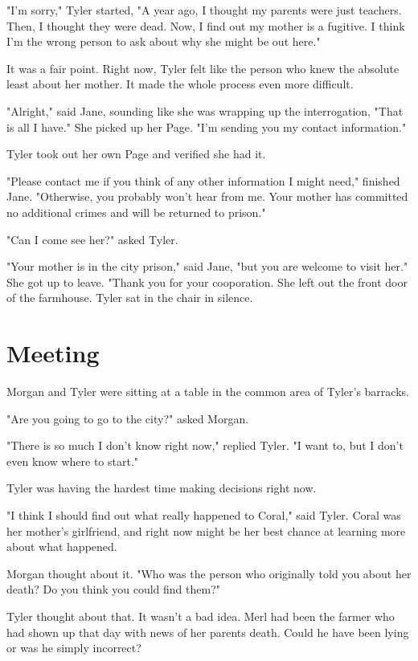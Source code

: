 \documentclass[courier]{sffms}
\begin{document}
"I'm sorry," Tyler started, "A year ago, I thought
my parents were just teachers. Then, I thought
they were dead. Now, I find out my mother is 
a fugitive. I think I'm the wrong person to ask
about why she might be out here."

It was a fair point. Right now, Tyler felt like the
person who knew the absolute least about her
mother. It made the whole process even more
difficult.

"Alright," said Jane, sounding like she was
wrapping up the interrogation, "That is all
I have." She picked up her Page. "I'm sending
you my contact information."

Tyler took out her own Page and verified 
she had it.

"Please contact me if you think of any
other information I might need," finished
Jane. "Otherwise, you probably won't
hear from me. Your mother has committed
no additional crimes and will be returned
to prison."

"Can I come see her?" asked Tyler.

"Your mother is in the city prison,"
said Jane, "but you are welcome to
visit her." She got up to leave. "Thank
you for your cooporation. She left out
the front door of the farmhouse. Tyler
sat in the chair in silence.

\chapter{Meeting}
Morgan and Tyler were sitting at a table
in the common area of Tyler's barracks.

"Are you going to go to the city?" asked
Morgan.

"There is so much I don't know right now,"
replied Tyler. "I want to, but I don't even
know where to start."

Tyler was having the hardest time making
decisions right now.

"I think I should find out what really
happened to Coral," said Tyler. Coral
was her mother's girlfriend, and right now
might be her best chance at learning more
about what happened.

Morgan thought about it. "Who was the
person who originally told you about her
death? Do you think you could find them?"

Tyler thought about that. It wasn't a bad
idea. Merl had been the farmer who had
shown up that day with news of her
parents death. Could he have been lying or
was he simply incorrect?
\end{document}
